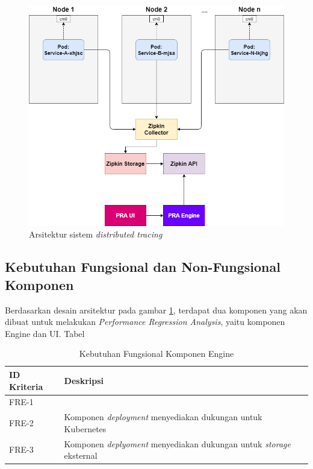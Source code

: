 \begin{figure}[!htb]
	\centering
	\includegraphics[width=1\textwidth]{resources/ch3/arch.png}
	\caption{Arsitektur sistem \textit{distributed tracing}}
	\label{arch-pra}
\end{figure}

\subsection{Kebutuhan Fungsional dan Non-Fungsional Komponen}

Berdasarkan desain arsitektur pada gambar \ref{arch-pra}, terdapat dua komponen yang akan dibuat untuk melakukan \textit{Performance Regression Analysis}, yaitu komponen Engine dan UI. Tabel 

\begin{small}
	\begin{longtable}{ | p{3cm} | p{10cm} |}
		\caption{Kebutuhan Fungsional Komponen Engine}
		\label{ch3-func-engine}                                                           
		\\ \hline
		\centering\bfseries{ID Kriteria} & \centering\bfseries{Deskripsi} \tabularnewline \hline
		\endfirsthead
		FRE-1 &  \\ \hline
		FRE-2 & Komponen \textit{deployment} menyediakan dukungan untuk Kubernetes \\ \hline
		FRE-3 & Komponen \textit{deplyoment} menyediakan dukungan untuk \textit{storage} eksternal \\ \hline
	\end{longtable}
\end{small}

